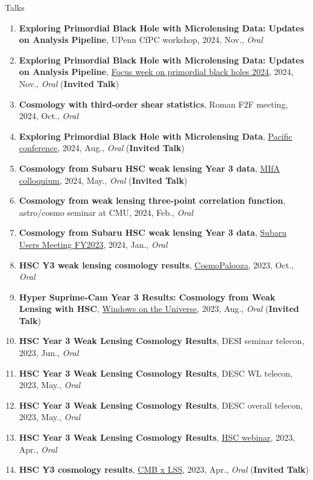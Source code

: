 \begin{rSection}{Talks}
\begin{enumerate}[itemsep=0pt, parsep=0pt, topsep=0pt, partopsep=0pt]
\item \textbf{Exploring Primordial Black Hole with Microlensing Data: Updates on Analysis Pipeline}, UPenn CfPC workshop, 2024, Nov., \textit{Oral}
\item \textbf{Exploring Primordial Black Hole with Microlensing Data: Updates on Analysis Pipeline}, \href{https://indico.ipmu.jp/event/439/overview}{Focus week on primordial black holes 2024}, 2024, Nov., \textit{Oral} (\textbf{Invited Talk})
\item \textbf{Cosmology with third-order shear statistics}, Roman F2F meeting, 2024, Oct., \textit{Oral}
\item \textbf{Exploring Primordial Black Hole with Microlensing Data}, \href{https://pacific-conference.pa.ucla.edu/index.html}{Pacific conference}, 2024, Aug., \textit{Oral} (\textbf{Invited Talk})
\item \textbf{Cosmology from Subaru HSC weak lensing Year 3 data}, \href{https://cse.umn.edu/physics/minnesota-institute-astrophysics-mifa-colloquium}{MIfA colloquium}, 2024, May., \textit{Oral} (\textbf{Invited Talk})
\item \textbf{Cosmology from weak lensing three-point correlation function}, astro/cosmo seminar at CMU, 2024, Feb., \textit{Oral}
\item \textbf{Cosmology from Subaru HSC weak lensing Year 3 data}, \href{https://www.subarutelescope.org/Science/SubaruUM/SubaruUM2023/index.html}{Subaru Users Meeting FY2023}, 2024, Jan., \textit{Oral}
\item \textbf{HSC Y3 weak lensing cosmology results}, \href{https://cosmopalooza.lbl.gov/}{CosmoPalooza}, 2023, Oct., \textit{Oral}
\item \textbf{Hyper Suprime-Cam Year 3 Results: Cosmology from Weak Lensing with HSC}, \href{http://vietnam.in2p3.fr/2023/windows/index.html}{Windows on the Universe}, 2023, Aug., \textit{Oral} (\textbf{Invited Talk})
\item \textbf{HSC Year 3 Weak Lensing Cosmology Results}, DESI seminar telecon, 2023, Jun., \textit{Oral}
\item \textbf{HSC Year 3 Weak Lensing Cosmology Results}, DESC WL telecon, 2023, May., \textit{Oral}
\item \textbf{HSC Year 3 Weak Lensing Cosmology Results}, DESC overall telecon, 2023, May., \textit{Oral}
\item \textbf{HSC Year 3 Weak Lensing Cosmology Results}, \href{https://hsc-release.mtk.nao.ac.jp/doc/index.php/wly3/}{HSC webinar}, 2023, Apr., \textit{Oral}
\item \textbf{HSC Y3 cosmology results}, \href{https://www2.yukawa.kyoto-u.ac.jp/~cmb-lss/index.php}{CMB x LSS}, 2023, Apr., \textit{Oral} (\textbf{Invited Talk})

\end{enumerate}
\end{rSection}
